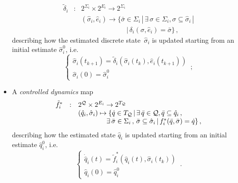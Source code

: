 \documentclass[journal, onecolumn, 12pt]{styles/IEEEtran}
\begin{document}
\begin{itemize}
\begin{equation*}
\begin{array}{rcl}
\tilde{\delta}_i  & : & 2^{\Sigma_i} \times 2^{E_i} \rightarrow 2^{\Sigma_i} \\
& & (\hat{\sigma}_i, \hat{e}_i) \rightarrow \{\bar{\sigma} \in \Sigma_i \, | \, \exists \, \sigma \in \Sigma_i, \sigma \subseteq \hat{\sigma}_i \, | \\
& & \;\;\;\;\;\;\;\;\;\;\;\;\;\;\;\;\;\;\;\;\;\;\;\; | \, \delta_i(\sigma, \hat{e}_i) = \bar{\sigma} \} \, ,
\end{array}
\end{equation*}
describing how the estimated discrete state~$\hat{\sigma}_i$ is updated starting from an initial estimate $\hat\sigma_i^0$, i.e.
$$
\left\lbrace
\begin{array}{l}
\hat{\sigma}_i(t_{k+1}) = \tilde{\delta}_i(\hat{\sigma}_i(t_k), \hat{e}_i(t_{k+1})) \\
\hat{\sigma}_i(0) = \hat\sigma_i^0
\end{array}
\right. 
\, ;
\label{eq:model-manager}
$$
\item
A {\em controlled dynamics} map
\begin{equation*}
\begin{array}{rcl}
\tilde{f}^*_i & : & 2^\mathcal{Q} \times 2^{E_i} \rightarrow 2^{T_\mathcal{Q}} \\
& & (\hat{q}_i, \hat{\sigma}_i) \mapsto \{\dot{q} \in T_\mathcal{Q} \, | \, \exists \, \bar{q} \in \mathcal{Q} , \bar{q} \subseteq \hat{q}_i \,  , \\
& & \;\;\;\;\;\;\;\;\;\;\;\;\;\;\; \exists \, \bar{\sigma} \in \Sigma_i \, , \, \bar{\sigma} \subseteq \hat{\sigma}_i \, | \, f^*_i(\bar{q}, \bar{\sigma}) = \dot{q} \} \, ,
\end{array}
\end{equation*}
describing how the estimated state $\hat{q}_i$ is updated starting from an initial estimate $\hat{q}_i^0$, i.e.
$$
\left\lbrace
\begin{array}{l}
\dot{\hat{q}}_i(t) = \tilde{f}^*_i(\hat{q}_i(t), \hat{\sigma}_i(t_k)) \\
\hat{q}_i(0) = \hat{q}_i^0 
\end{array}
\right. 
\, .
$$
\end{itemize}
\end{document}
